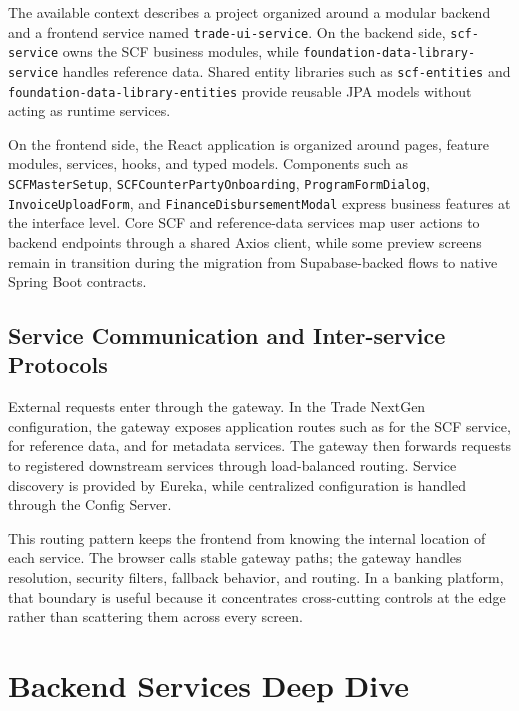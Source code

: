 The available context describes a project organized around a modular backend and a frontend service named \texttt{trade-ui-service}. On the backend side, \texttt{scf-service} owns the SCF business modules, while \texttt{foundation-data-library-service} handles reference data. Shared entity libraries such as \texttt{scf-entities} and \texttt{foundation-data-library-entities} provide reusable JPA models without acting as runtime services.

On the frontend side, the React application is organized around pages, feature modules, services, hooks, and typed models. Components such as \texttt{SCFMasterSetup}, \texttt{SCFCounterPartyOnboarding}, \texttt{ProgramFormDialog}, \texttt{InvoiceUploadForm}, and \texttt{FinanceDisbursementModal} express business features at the interface level. Core SCF and reference-data services map user actions to backend endpoints through a shared Axios client, while some preview screens remain in transition during the migration from Supabase-backed flows to native Spring Boot contracts.

\subsection{Service Communication and Inter-service Protocols}
\label{subsec:service_communication}

External requests enter through the gateway. In the Trade NextGen configuration, the gateway exposes application routes such as  for the SCF service,  for reference data, and  for metadata services. The gateway then forwards requests to registered downstream services through load-balanced routing. Service discovery is provided by Eureka, while centralized configuration is handled through the Config Server.

This routing pattern keeps the frontend from knowing the internal location of each service. The browser calls stable gateway paths; the gateway handles resolution, security filters, fallback behavior, and routing. In a banking platform, that boundary is useful because it concentrates cross-cutting controls at the edge rather than scattering them across every screen.

\section{Backend Services Deep Dive}
\label{sec:backend_deep_dive}

